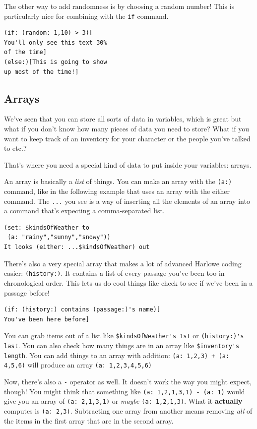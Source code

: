 \documentclass[a5paper,11pt]{article}
\begin{document}
The other way to add randomness is by choosing a random number! This is particularly nice for combining with the \verb|if| command.

\begin{verbatim}
(if: (random: 1,10) > 3)[
You'll only see this text 30%
of the time]
(else:)[This is going to show
up most of the time!]
\end{verbatim}

\subsection{Arrays}
We've seen that you can store all sorts of data in variables, which is great but what if you don't know how many pieces of data you need to store? What if you want to keep track of an inventory for your character or the people you've talked to etc.?

That's where you need a special kind of data to put inside your variables: arrays.

An array is basically a \emph{list} of things. You can make an array with the \verb|(a:)| command, like in the following example that uses an array with the either command. The \verb|...| you see is a way of inserting all the elements of an array into a command that's expecting a comma-separated list.

\begin{verbatim}
(set: $kindsOfWeather to 
 (a: "rainy","sunny","snowy"))
It looks (either: ...$kindsOfWeather) out
\end{verbatim}

There's also a very special array that makes a lot of advanced Harlowe coding easier: \verb|(history:)|. It contains a list of every passage you've been too in chronological order. This lets us do cool things like check to see if we've been in a passage before!

\begin{verbatim}
(if: (history:) contains (passage:)'s name)[
You've been here before]
\end{verbatim}

You can grab items out of a list like \verb|$kindsOfWeather's 1st| or \verb|(history:)'s last|. You can also check how many things are in an array like \verb|$inventory's length|. You can add things to an array with addition: \verb|(a: 1,2,3) + (a: 4,5,6)| will produce an array \verb|(a: 1,2,3,4,5,6)|

Now, there's also a \verb"-" operator as well. It doesn't work the way you might expect, though! You might think that something like \verb|(a: 1,2,1,3,1) - (a: 1)| would give you an array of \verb|(a: 2,1,3,1)| or \textit{maybe} \verb|(a: 1,2,1,3)|. What it \textbf{actually} computes is \verb|(a: 2,3)|. Subtracting one array from another means removing \textit{all} of the items in the first array that are in the second array.
\end{document}
